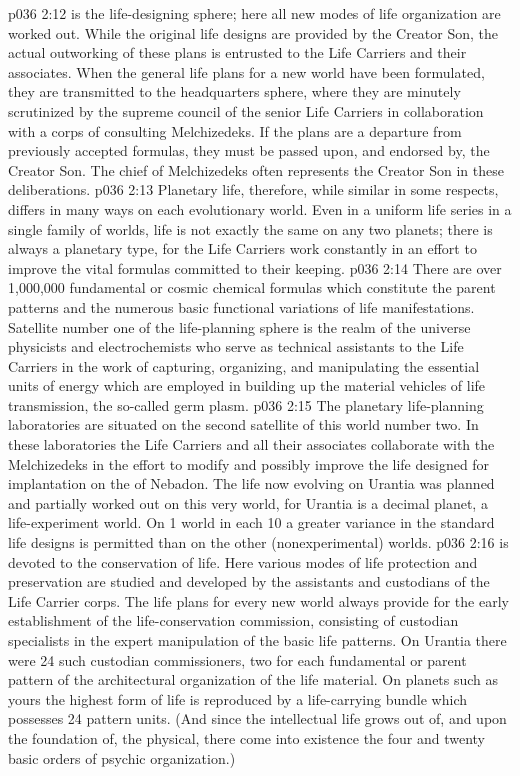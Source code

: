 \vs p036 2:12 \pc {} is the life\hyp{}designing sphere; here all new modes of life organization are worked out. While the original life designs are provided by the Creator Son, the actual outworking of these plans is entrusted to the Life Carriers and their associates. When the general life plans for a new world have been formulated, they are transmitted to the headquarters sphere, where they are minutely scrutinized by the supreme council of the senior Life Carriers in collaboration with a corps of consulting Melchizedeks. If the plans are a departure from previously accepted formulas, they must be passed upon, and endorsed by, the Creator Son. The chief of Melchizedeks often represents the Creator Son in these deliberations.
\vs p036 2:13 Planetary life, therefore, while similar in some respects, differs in many ways on each evolutionary world. Even in a uniform life series in a single family of worlds, life is not exactly the same on any two planets; there is always a planetary type, for the Life Carriers work constantly in an effort to improve the vital formulas committed to their keeping.
\vs p036 2:14 There are over 1,000,000 fundamental or cosmic chemical formulas which constitute the parent patterns and the numerous basic functional variations of life manifestations. Satellite number one of the life\hyp{}planning sphere is the realm of the universe physicists and electrochemists who serve as technical assistants to the Life Carriers in the work of capturing, organizing, and manipulating the essential units of energy which are employed in building up the material vehicles of life transmission, the so\hyp{}called germ plasm.
\vs p036 2:15 The planetary life\hyp{}planning laboratories are situated on the second satellite of this world number two. In these laboratories the Life Carriers and all their associates collaborate with the Melchizedeks in the effort to modify and possibly improve the life designed for implantation on the  of Nebadon. The life now evolving on Urantia was planned and partially worked out on this very world, for Urantia is a decimal planet, a life\hyp{}experiment world. On 1 world in each 10 a greater variance in the standard life designs is permitted than on the other (nonexperimental) worlds.
\vs p036 2:16 \pc {} is devoted to the conservation of life. Here various modes of life protection and preservation are studied and developed by the assistants and custodians of the Life Carrier corps. The life plans for every new world always provide for the early establishment of the life\hyp{}conservation commission, consisting of custodian specialists in the expert manipulation of the basic life patterns. On Urantia there were 24 such custodian commissioners, two for each fundamental or parent pattern of the architectural organization of the life material. On planets such as yours the highest form of life is reproduced by a life\hyp{}carrying bundle which possesses 24 pattern units. (And since the intellectual life grows out of, and upon the foundation of, the physical, there come into existence the four and twenty basic orders of psychic organization.)
